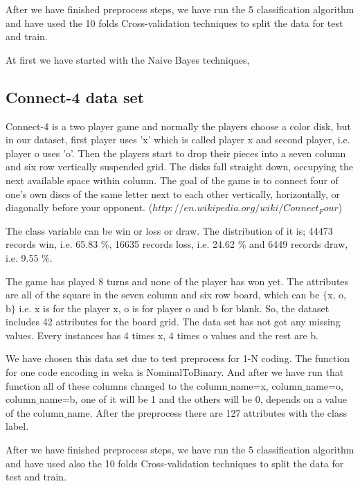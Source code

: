 \documentclass[a4paper]{article}
\begin{document}
After we have finished preprocess steps, we have run the 5 classification algorithm and have used the 10 folds Cross-validation techniques to split the data for test and train. 

At first we have started with the Naive Bayes techniques,











\subsection{Connect-4 data set}

Connect-4 is a two player game and normally the players choose a color disk, but in our dataset, first player uses 'x' which is called player x and second player, i.e. player o uses 'o'. Then the players start to drop their pieces into a seven column and six row vertically suspended grid. The disks fall straight down, occupying the next available space within column. The goal of the game is to connect four of one's own discs of the same letter next to each other vertically, horizontally, or diagonally before your opponent. ($http://en.wikipedia.org/wiki/Connect_Four$) 

The class variable can be win or loss or draw. The distribution of it is; 44473 records win, i.e. 65.83 $\%$, 16635 records loss,  i.e. 24.62 $\%$ and 6449 records draw,  i.e. 9.55 $\%$.

The game has played 8 turns and none of the player has won yet. The attributes are all of the square in the seven column and six row board, which can be $\{$x, o, b$\}$ i.e. x is for the player x, o is for player o and b for blank. So, the dataset includes 42 attributes for the board grid. The data set has not got any missing values. Every instances has 4 times x, 4 times o values and the rest are b. 

We have chosen this data set due to test preprocess for 1-N coding. The function for one code encoding in weka is NominalToBinary. And after we have run that function all of these columns changed to the column$\_$name=x, column$\_$name=o, column$\_$name=b, one of it will be 1 and the others will be 0, depends on a value of the column$\_$name. After the preprocess there are 127 attributes with the class label. 

After we have finished preprocess steps, we have run the 5 classification algorithm and have used also the 10 folds Cross-validation techniques to split the data for test and train. 
\end{document}

